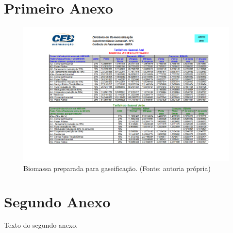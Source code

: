 \begin{anexosenv}

\partanexos

\chapter{Primeiro Anexo}

\begin{landscape}
\begin{figure}[!htb]
	\centering
	\includegraphics{Figuras/thsjun18}
	\caption{Biomassa preparada para gaseificação. (Fonte: autoria própria)}
	\label{ths}
\end{figure}
\end{landscape}


\chapter{Segundo Anexo}

Texto do segundo anexo.

\end{anexosenv}

